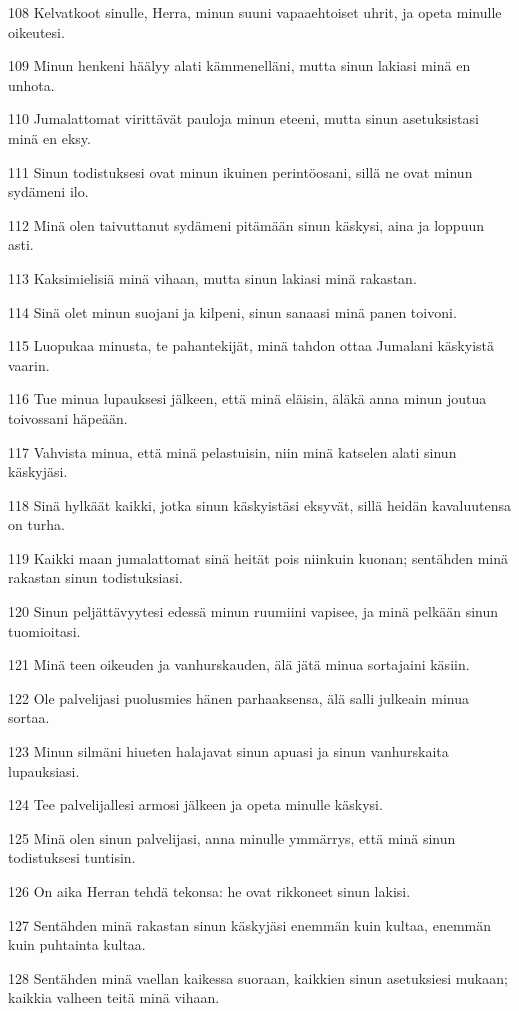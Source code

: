 \par 108 Kelvatkoot sinulle, Herra, minun suuni vapaaehtoiset uhrit, ja opeta minulle oikeutesi.
\par 109 Minun henkeni häälyy alati kämmenelläni, mutta sinun lakiasi minä en unhota.
\par 110 Jumalattomat virittävät pauloja minun eteeni, mutta sinun asetuksistasi minä en eksy.
\par 111 Sinun todistuksesi ovat minun ikuinen perintöosani, sillä ne ovat minun sydämeni ilo.
\par 112 Minä olen taivuttanut sydämeni pitämään sinun käskysi, aina ja loppuun asti.
\par 113 Kaksimielisiä minä vihaan, mutta sinun lakiasi minä rakastan.
\par 114 Sinä olet minun suojani ja kilpeni, sinun sanaasi minä panen toivoni.
\par 115 Luopukaa minusta, te pahantekijät, minä tahdon ottaa Jumalani käskyistä vaarin.
\par 116 Tue minua lupauksesi jälkeen, että minä eläisin, äläkä anna minun joutua toivossani häpeään.
\par 117 Vahvista minua, että minä pelastuisin, niin minä katselen alati sinun käskyjäsi.
\par 118 Sinä hylkäät kaikki, jotka sinun käskyistäsi eksyvät, sillä heidän kavaluutensa on turha.
\par 119 Kaikki maan jumalattomat sinä heität pois niinkuin kuonan; sentähden minä rakastan sinun todistuksiasi.
\par 120 Sinun peljättävyytesi edessä minun ruumiini vapisee, ja minä pelkään sinun tuomioitasi.
\par 121 Minä teen oikeuden ja vanhurskauden, älä jätä minua sortajaini käsiin.
\par 122 Ole palvelijasi puolusmies hänen parhaaksensa, älä salli julkeain minua sortaa.
\par 123 Minun silmäni hiueten halajavat sinun apuasi ja sinun vanhurskaita lupauksiasi.
\par 124 Tee palvelijallesi armosi jälkeen ja opeta minulle käskysi.
\par 125 Minä olen sinun palvelijasi, anna minulle ymmärrys, että minä sinun todistuksesi tuntisin.
\par 126 On aika Herran tehdä tekonsa: he ovat rikkoneet sinun lakisi.
\par 127 Sentähden minä rakastan sinun käskyjäsi enemmän kuin kultaa, enemmän kuin puhtainta kultaa.
\par 128 Sentähden minä vaellan kaikessa suoraan, kaikkien sinun asetuksiesi mukaan; kaikkia valheen teitä minä vihaan.
